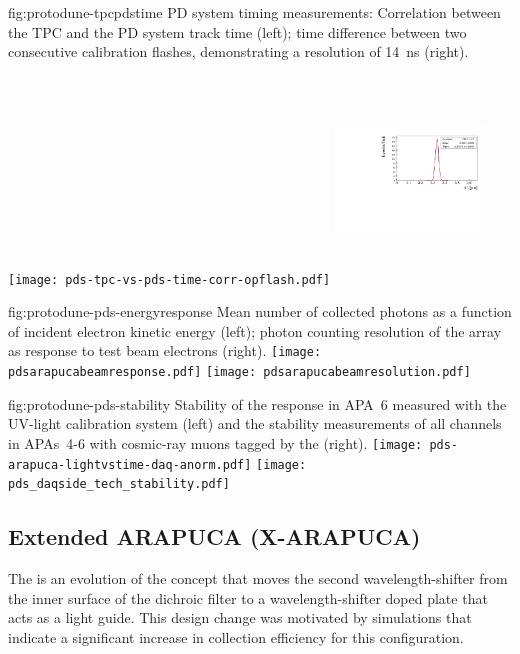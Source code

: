 \begin{dunefigure}{fig:protodune-tpcpdstime}
{PD system timing measurements: Correlation between the TPC and the PD system track time (left); time difference between two consecutive calibration flashes, demonstrating a resolution of \SI{14}{ns} (right).}

\texttt{[image: pds-tpc-vs-pds-time-corr-opflash.pdf]}
\includegraphics[height=5.5cm,width=0.3\textwidth]{graphics/pds-example-dT.pdf}
\end{dunefigure}

\begin{dunefigure}{fig:protodune-pds-energyresponse}
{Mean number of collected photons as a function of incident electron kinetic energy (left);  photon counting resolution of the  array as response to test beam electrons (right).}
\texttt{[image: pdsarapucabeamresponse.pdf]}
\texttt{[image: pdsarapucabeamresolution.pdf]}

\end{dunefigure}

\begin{dunefigure}{fig:protodune-pds-stability}
{Stability of the  response in APA~6 measured with the UV-light calibration system (left) and the stability measurements of all  channels in APAs~4-6 with cosmic-ray muons tagged by the  (right).}
\texttt{[image: pds-arapuca-lightvstime-daq-anorm.pdf]}
\texttt{[image: pds\_daqside\_tech\_stability.pdf]}
\end{dunefigure}

 
\subsection{Extended ARAPUCA (X-ARAPUCA)}
\label{sec:xarapuca-valid}


The  is an evolution of the  concept that moves the second wavelength-shifter from the inner surface of the dichroic filter to a wavelength-shifter doped plate that acts as a light guide. This design change was motivated by simulations that indicate a significant increase in collection efficiency for this configuration. 

